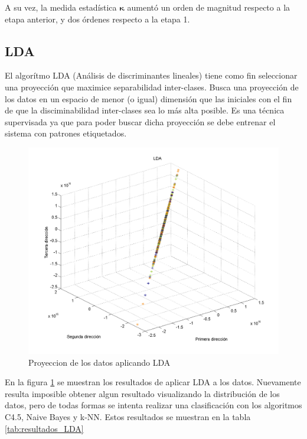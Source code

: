\documentclass[12pt,a4paper,titlepage]{report}
\newcommand{\bs}{\boldsymbol}
\begin{document}
A su vez, la medida estadística $\bs\kappa$ aumentó un orden de magnitud respecto a la etapa anterior, y dos órdenes respecto a la etapa 1.

\subsection{LDA}
El algorítmo LDA (Análisis de discriminantes lineales) tiene como fin seleccionar una proyección que maximice separabilidad inter-clases. Busca una proyección de los datos en un espacio de menor (o igual) dimensión que las iniciales con el fin de que la disciminabilidad inter-clases sea lo más alta posible. Es una técnica supervisada ya que para poder buscar dicha proyección se debe entrenar el sistema con patrones etiquetados.\\

\begin{figure}
	\centering 
	\includegraphics[width=.8\textwidth]{pics/lda}
	\caption{Proyeccion de los datos aplicando LDA}
	\label{fig:lda}
\end{figure}

En la figura \ref{fig:lda} se muestran los resultados de aplicar LDA a los datos. Nuevamente resulta imposible obtener algun resultado visualizando la distribución de los datos, pero de todas formas se intenta realizar una clasificación con los algoritmos C4.5, Naive Bayes y k-NN. Estos resultados se muestran en la tabla \ref{tab:resultados_LDA}
\end{document}
